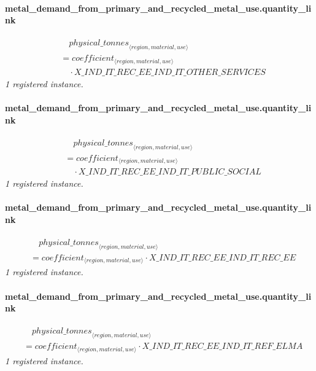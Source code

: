\documentclass[11pt]{article}
\begin{document}
\paragraph{metal\_demand\_from\_primary\_and\_recycled\_metal\_use.quantity\_link}
\begin{align*}
&\quad {physical\_tonnes}_{\langle region, material, use\rangle}\\
&= coefficient_{\langle region, material, use\rangle}\\
&\quad {}\cdot X\_IND\_IT\_REC\_EE\_IND\_IT\_OTHER\_SERVICES
\end{align*}
\noindent\emph{1 registered instance.}\par
\paragraph{metal\_demand\_from\_primary\_and\_recycled\_metal\_use.quantity\_link}
\begin{align*}
&\quad {physical\_tonnes}_{\langle region, material, use\rangle}\\
&= coefficient_{\langle region, material, use\rangle}\\
&\quad {}\cdot X\_IND\_IT\_REC\_EE\_IND\_IT\_PUBLIC\_SOCIAL
\end{align*}
\noindent\emph{1 registered instance.}\par
\paragraph{metal\_demand\_from\_primary\_and\_recycled\_metal\_use.quantity\_link}
\begin{align*}
&\quad {physical\_tonnes}_{\langle region, material, use\rangle}\\
&= coefficient_{\langle region, material, use\rangle} \cdot X\_IND\_IT\_REC\_EE\_IND\_IT\_REC\_EE
\end{align*}
\noindent\emph{1 registered instance.}\par
\paragraph{metal\_demand\_from\_primary\_and\_recycled\_metal\_use.quantity\_link}
\begin{align*}
&\quad {physical\_tonnes}_{\langle region, material, use\rangle}\\
&= coefficient_{\langle region, material, use\rangle} \cdot X\_IND\_IT\_REC\_EE\_IND\_IT\_REF\_ELMA
\end{align*}
\noindent\emph{1 registered instance.}\par
\end{document}
